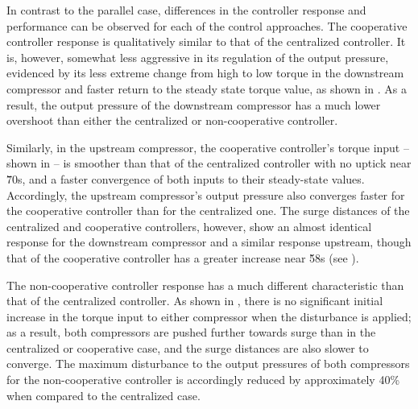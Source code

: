 In contrast to the parallel case, differences in the controller response and performance can be observed for each of the control approaches.
The cooperative controller response is qualitatively similar to that of the centralized controller.
It is, however, somewhat less aggressive in its regulation of the output pressure, evidenced by its less extreme change from high to low torque in the downstream compressor and faster return to the steady state torque value, as shown in .
As a result, the output pressure of the downstream compressor has a much lower overshoot than either the centralized or non-cooperative controller.

Similarly, in the upstream compressor, the cooperative controller's torque input -- shown in  -- is smoother than that of the centralized controller with no uptick near \u{70}{s}, and a faster convergence of both inputs to their steady-state values.
Accordingly, the upstream compressor's output pressure also converges faster for the cooperative controller than for the centralized one.
The surge distances of the centralized and cooperative controllers, however, show an almost identical response for the downstream compressor and a similar response upstream, though that of the cooperative controller has a greater increase near \u{58}{s} (see ).

The non-cooperative controller response has a much different characteristic than that of the centralized controller.
As shown in , there is no significant initial increase in the torque input to either compressor when the disturbance is applied; as a result, both compressors are pushed further towards surge than in the centralized or cooperative case, and the surge distances are also slower to converge.
The maximum disturbance to the output pressures of both compressors for the non-cooperative controller is accordingly reduced by approximately 40\% when compared to the centralized case.

